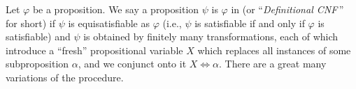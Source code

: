 \begin{definition}\label{prop-000W}%
Let $\varphi$ be a proposition.
We say a proposition $\psi$ is $\varphi$ in 
(or ``\textit{Definitional CNF}\,'' for short) if
$\psi$ is equisatisfiable as $\varphi$ (i.e., $\psi$ is satisfiable if
and only if $\varphi$ is satisfiable) and $\psi$ is obtained by finitely
many transformations, each of which introduce a ``fresh'' propositional
variable $X$ which replaces all instances of some subproposition
$\alpha$, and we conjunct onto it $X\iff\alpha$. There are a great many
variations of the procedure.

\end{definition}

